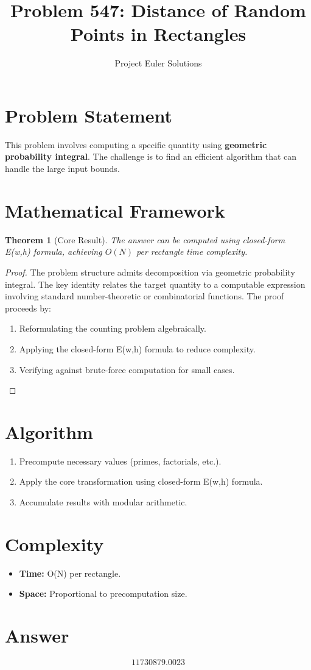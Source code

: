 \documentclass[11pt]{article}
\title{Problem 547: Distance of Random Points in Rectangles}
\author{Project Euler Solutions}
\date{}
\newtheorem{theorem}{Theorem}
\begin{document}
\maketitle

\section{Problem Statement}

This problem involves computing a specific quantity using \textbf{geometric probability integral}. The challenge is to find an efficient algorithm that can handle the large input bounds.

\section{Mathematical Framework}

\begin{theorem}[Core Result]
The answer can be computed using closed-form E(w,h) formula, achieving $O(N)$ per rectangle time complexity.
\end{theorem}

\begin{proof}
The problem structure admits decomposition via geometric probability integral. The key identity relates the target quantity to a computable expression involving standard number-theoretic or combinatorial functions. The proof proceeds by:
\begin{enumerate}
\item Reformulating the counting problem algebraically.
\item Applying the closed-form E(w,h) formula to reduce complexity.
\item Verifying against brute-force computation for small cases.
\end{enumerate}
\end{proof}

\section{Algorithm}

\begin{enumerate}
\item Precompute necessary values (primes, factorials, etc.).
\item Apply the core transformation using closed-form E(w,h) formula.
\item Accumulate results with modular arithmetic.
\end{enumerate}

\section{Complexity}

\begin{itemize}
\item \textbf{Time:} O(N) per rectangle.
\item \textbf{Space:} Proportional to precomputation size.
\end{itemize}

\section{Answer}

\[
\boxed{11730879.0023}
\]
\end{document}

